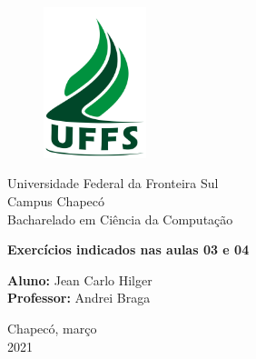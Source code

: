 \documentclass[a4paper, 12pt]{article}
\begin{document}

\begin{titlepage}
	\begin{center}
    	\begin{figure}[!ht]
        	\centering
        	\includegraphics[width=3cm]{./imgs/uffs.png}
    	\end{figure}
    
    	\Huge{Universidade Federal da Fronteira Sul}\\
    	\large{Campus Chapecó}\\ 
    	\large{Bacharelado em Ciência da Computação}\\ 
    	
    	\vspace{15pt}
        \vspace{95pt}
        
        \textbf{\LARGE{Exercícios indicados nas aulas 03 e 04}}\\
    	
        \vspace{3,5cm}
	\end{center}
	
	\begin{flushleft}
	    \begin{tabbing}
			\textbf{Aluno:} Jean Carlo Hilger \\
			\textbf{Professor:} Andrei Braga \\
        \end{tabbing}
    \end{flushleft}
	
	\vspace{1cm}
	
	\begin{center}
		\vspace{\fill}
		Chapecó, março\\
		2021
	\end{center}
\end{titlepage}
\end{document}
